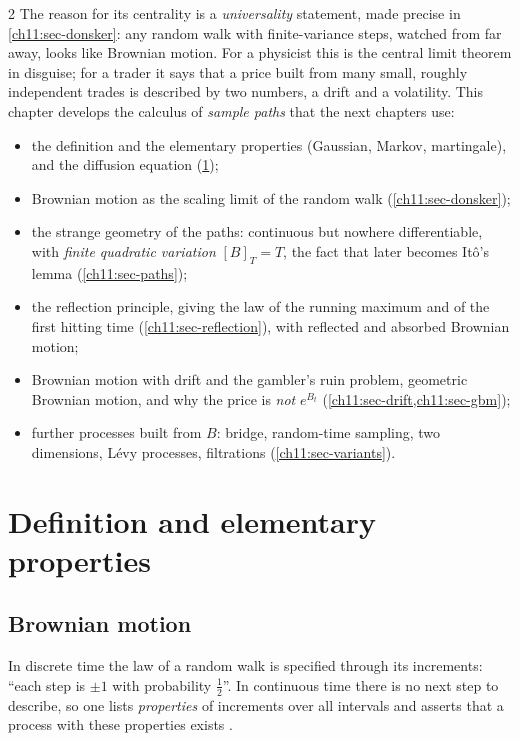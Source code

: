 \begin{paracol}{2}
The reason for its centrality is a \emph{universality} statement, made precise in \cref{ch11:sec-donsker}: any random walk with
finite-variance steps, watched from far away, looks like Brownian motion. For a physicist this is the central limit theorem in
disguise; for a trader it says that a price built from many small, roughly independent trades is described by two numbers, a
drift and a volatility. This chapter develops the calculus of \emph{sample paths} that the next chapters use:

\begin{itemize}
  \item the definition and the elementary properties (Gaussian, Markov, martingale), and the diffusion equation
        (\cref{ch11:sec-def});
  \item Brownian motion as the scaling limit of the random walk (\cref{ch11:sec-donsker});
  \item the strange geometry of the paths: continuous but nowhere differentiable, with \emph{finite quadratic variation}
        $[B]_T=T$, the fact that later becomes It\^o's lemma (\cref{ch11:sec-paths});
  \item the reflection principle, giving the law of the running maximum and of the first hitting time
        (\cref{ch11:sec-reflection}), with reflected and absorbed Brownian motion;
  \item Brownian motion with drift and the gambler's ruin problem, geometric Brownian motion, and why the
        price is \emph{not} $e^{B_t}$ (\cref{ch11:sec-drift,ch11:sec-gbm});
  \item further processes built from $B$: bridge, random-time sampling, two dimensions, L\'evy processes, filtrations
        (\cref{ch11:sec-variants}).
\end{itemize}

\section{Definition and elementary properties}\label{ch11:sec-def}

\subsection{Brownian motion}
In discrete time the law of a random walk is specified through its increments: ``each step is $\pm1$ with probability
$\tfrac12$''. In continuous time there is no next step to describe, so one lists \emph{properties} of increments over all
intervals and asserts that a process with these properties exists .


\end{paracol}
